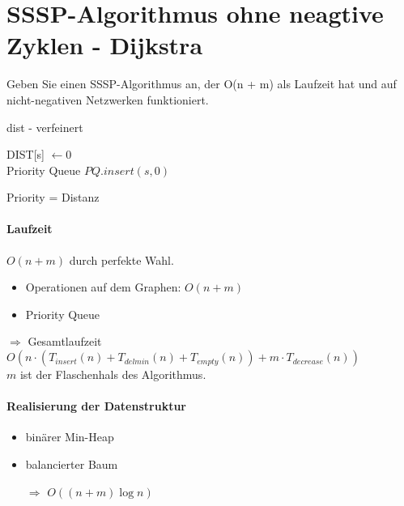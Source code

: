 \section{SSSP-Algorithmus ohne neagtive Zyklen - Dijkstra}
\label{sec-1}
Geben Sie einen SSSP-Algorithmus an, der O(n + m) als Laufzeit hat und auf nicht-negativen Netzwerken funktioniert.
\par 
\begin{algorithm}[H]
\caption{dist - verfeinert}
DIST[s] $\gets 0$ \\
Priority Queue $PQ.insert(s,0)$ \\
\end{algorithm}
Priority = Distanz

\paragraph{Laufzeit} $O(n+m)$ durch perfekte Wahl.
\begin{itemize}
 \item Operationen auf dem Graphen: $O(n+m)$
 \item Priority Queue 
\end{itemize}
$\Rightarrow$ Gesamtlaufzeit $O(n \cdot (T_{insert}(n) + T_{delmin}(n)+ T_{empty}(n)) + m \cdot T_{decrease}(n) )$\\
$m$ ist der Flaschenhals des Algorithmus.
\paragraph{Realisierung der Datenstruktur}
\begin{itemize}
 \item binärer Min-Heap
 \item balancierter Baum
 \item[$\Rightarrow$] $O((n+m)\log n)$
\end{itemize}


